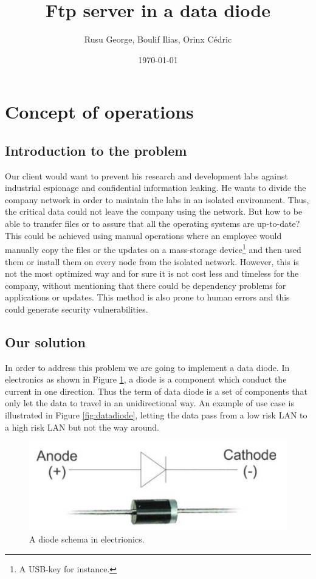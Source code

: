 \documentclass[a4paper,10pt]{article}
\title{Ftp server in a data diode}
\author{Rusu George, Boulif Ilias, Orinx Cédric}
\date{\today}
\begin{document}
\maketitle
\newpage
\tableofcontents
\newpage
\section{Concept of operations}
\subsection{Introduction to the problem}
Our client would want to prevent his research and development labs against industrial espionage and confidential information leaking. He wants to divide the company network in order to maintain the labs in an isolated environment. Thus, the critical data could not leave the company using the network. But how to be able to transfer files or to assure that all the operating systems are up-to-date? This could be achieved using manual operations where an employee would manually copy the files or the updates on a mass-storage device\footnote{A USB-key for instance.} and then used them or install them on every node from the isolated network. However, this is not the most optimized way and for sure it is not cost less and timeless for the company, without mentioning that there could be dependency problems for applications or updates. This method is also prone to human errors and this could generate security vulnerabilities.

\subsection{Our solution}
In order to address this problem we are going to implement a data diode. In electronics as shown in Figure \ref{fig:diode}, a diode is a component which conduct the current in one direction. Thus the term of data diode is a set of components that only let the data to travel in an unidirectional way. An example of use case is illustrated in Figure \ref{fig:datadiode}, letting the data pass from a low risk LAN to a high risk LAN but not the way around.
\begin{figure}
\centering
\includegraphics[scale=0.25]{images/diode.png}
\caption{A diode schema in electrionics.}
\label{fig:diode}
\end{figure}
\end{document}
